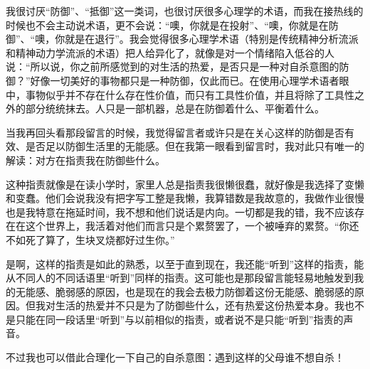 我很讨厌“防御”、“抵御”这一类词，也很讨厌很多心理学的术语，而我在接热线的时候也不会主动说术语，更不会说：“噢，你就是在投射”、“噢，你就是在防御”、“噢，你就是在退行”。我会觉得很多心理学术语（特别是传统精神分析流派和精神动力学流派的术语）把人给异化了，就像是对一个情绪陷入低谷的人说：“所以说，你之前所感觉到的对生活的热爱，是否只是一种对自杀意图的防御？”好像一切美好的事物都只是一种防御，仅此而已。在使用心理学术语者眼中，事物似乎并不存在什么存在性价值，而只有工具性价值，并且将除了工具性之外的部分统统抹去。人只是一部机器，总是在防御着什么、平衡着什么。

当我再回头看那段留言的时候，我觉得留言者或许只是在关心这样的防御是否有效、是否足以防御生活里的无能感。但在我第一眼看到留言时，我对此只有唯一的解读：对方在指责我在防御些什么。

这种指责就像是在读小学时，家里人总是指责我很懒很蠢，就好像是我选择了变懒和变蠢。他们会说我没有把字写工整是我懒，我算错数是我故意的，我做作业很慢也是我特意在拖延时间，我不想和他们说话是内向。一切都是我的错，我不应该存在在这个世界上，我活着对他们而言只是个累赘罢了，一个被唾弃的累赘。“你还不如死了算了，生块叉烧都好过生你。”

是啊，这样的指责是如此的熟悉，以至于直到现在，我还能“听到”这样的指责，能从不同人的不同话语里“听到”同样的指责。这可能也是那段留言能轻易地触发到我的无能感、脆弱感的原因，也是现在的我会去极力防御着这份无能感、脆弱感的原因。但我对生活的热爱并不只是为了防御些什么，还有热爱这份热爱本身。我也不是只能在同一段话里“听到”与以前相似的指责，或者说不是只能“听到”指责的声音。

不过我也可以借此合理化一下自己的自杀意图：遇到这样的父母谁不想自杀！
